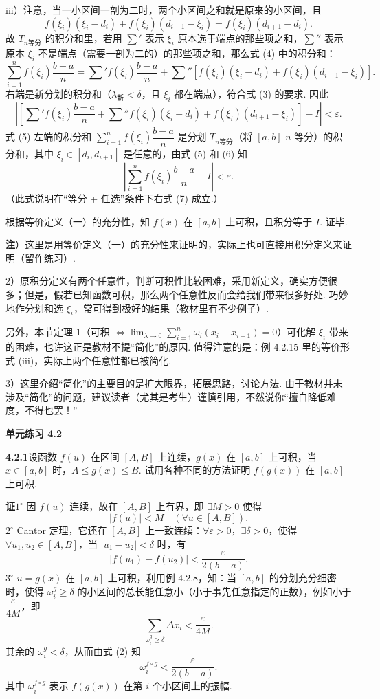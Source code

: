 \documentclass[UTF8,12pt,a4paper,fontset=fandol]{ctexart}
\begin{document}
iii）注意，当一小区间一剖为二时，两个小区间之和就是原来的小区间，且
\[
f(\xi_i)(\xi_i-d_i)+f(\xi_i)(d_{i+1}-\xi_i)=f(\xi_i)(d_{i+1}-d_i).
\]
故 $T_{n\text{等分}}$ 的积分和里，若用 $\sum'$ 表示 $\xi_i$ 原本选于端点的那些项之和，$\sum''$ 表示原本 $\xi_i$ 不是端点（需要一剖为二的）的那些项之和，那么式 (4) 中的积分和：
\[
\sum_{i=1}^n f(\xi_i)\frac{b-a}{n}
=\sum' f(\xi_i)\frac{b-a}{n}
+\sum''[f(\xi_i)(\xi_i-d_i)+f(\xi_i)(d_{i+1}-\xi_i)].
\tag{5}
\]
右端是新分划的积分和（$\lambda_{\text{新}}<\delta$，且 $\xi_i$ 都在端点），符合式 (3) 的要求. 因此
\[
\left|\left[\sum' f(\xi_i)\frac{b-a}{n}
+\sum'' f(\xi_i)(\xi_i-d_i)+f(\xi_i)(d_{i+1}-\xi_i)\right]-I\right|<\varepsilon.
\tag{6}
\]
式 (5) 左端的积分和 $\sum_{i=1}^n f(\xi_i)\dfrac{b-a}{n}$ 是分划 $T_{n\text{等分}}$（将 $[a,b]$ $n$ 等分）的积分和，其中 $\xi_i\in[d_i,d_{i+1}]$ 是任意的，由式 (5) 和 (6) 知
\[
\left|\sum_{i=1}^n f(\xi_i)\frac{b-a}{n}-I\right|<\varepsilon.
\tag{7}
\]
（此式说明在“等分 + 任选”条件下右式 (7) 成立.）

根据等价定义（一）的充分性，知 $f(x)$ 在 $[a,b]$ 上可积，且积分等于 $I$. 证毕.

\noindent\textbf{注}）这里是用等价定义（一）的充分性来证明的，实际上也可直接用积分定义来证明（留作练习）.

2）原积分定义有两个任意性，判断可积性比较困难，采用新定义，确实方便很多；但是，假若已知函数可积，那么两个任意性反而会给我们带来很多好处. 巧妙地作分划和选 $\xi_i$，常可得到极好的结果（教材里有不少例子）.

另外，本节定理 1（可积 $\Leftrightarrow\lim_{\lambda\to0}\sum_{i=1}^n\omega_i(x_i-x_{i-1})=0$）可化解 $\xi_i$ 带来的困难，也许这正是教材不提“简化”的原因. 值得注意的是：例 4.2.15 里的等价形式 (iii)，实际上两个任意性都已被简化.

3）这里介绍“简化”的主要目的是扩大眼界，拓展思路，讨论方法. 由于教材并未涉及“简化”的问题，建议读者（尤其是考生）谨慎引用，不然说你“擅自降低难度，不得也罢！”

\noindent\textbf{单元练习 4.2}

\noindent\textbf{4.2.1}\quad 设函数 $f(u)$ 在区间 $[A,B]$ 上连续，$g(x)$ 在 $[a,b]$ 上可积，当 $x\in[a,b]$ 时，$A\le g(x)\le B$. 试用各种不同的方法证明 $f(g(x))$ 在 $[a,b]$ 上可积.

\noindent\textbf{证}\quad $1^\circ$ 因 $f(u)$ 连续，故在 $[A,B]$ 上有界，即 $\exists M>0$ 使得
\[
|f(u)|<M\quad(\forall u\in[A,B]).
\tag{1}
\]
$2^\circ$ Cantor 定理，它还在 $[A,B]$ 上一致连续：$\forall\varepsilon>0$，$\exists\delta>0$，使得 $\forall u_1,u_2\in[A,B]$，当 $|u_1-u_2|<\delta$ 时，有
\[
|f(u_1)-f(u_2)|<\frac{\varepsilon}{2(b-a)}.
\tag{2}
\]
$3^\circ$ $u=g(x)$ 在 $[a,b]$ 上可积，利用例 4.2.8，知：当 $[a,b]$ 的分划充分细密时，使得 $\omega_i^g\ge\delta$ 的小区间的总长能任意小（小于事先任意指定的正数），例如小于 $\dfrac{\varepsilon}{4M}$，即
\[
\sum_{\omega_i^g\ge\delta}\Delta x_i<\frac{\varepsilon}{4M}.
\tag{3}
\]
其余的 $\omega_i^g<\delta$，从而由式 (2) 知
\[
\omega_i^{f\circ g}<\frac{\varepsilon}{2(b-a)}.
\tag{4}
\]
其中 $\omega_i^{f\circ g}$ 表示 $f(g(x))$ 在第 $i$ 个小区间上的振幅.
\end{document}
